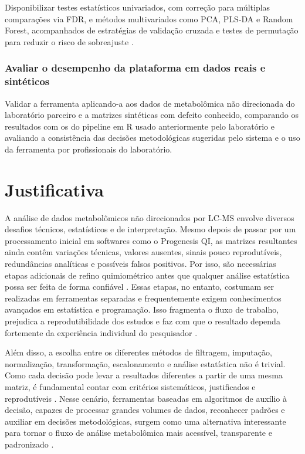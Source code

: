Disponibilizar testes estatísticos univariados, com correção para múltiplas comparações via FDR, e métodos multivariados como PCA, PLS-DA e Random Forest, acompanhados de estratégias de validação cruzada e testes de permutação para reduzir o risco de sobreajuste \cite{worley2013multivariate}.

\subsubsection{Avaliar o desempenho da plataforma em dados reais e sintéticos}
 
Validar a ferramenta aplicando-a aos dados de metabolômica não direcionada do laboratório parceiro e a matrizes sintéticas com defeito conhecido, comparando os resultados com os do pipeline em R usado anteriormente pelo laboratório e avaliando a consistência das decisões metodológicas sugeridas pelo sistema e o uso da ferramenta por profissionais do laboratório.

\section{Justificativa}
 
A análise de dados metabolômicos não direcionados por LC-MS envolve diversos desafios técnicos, estatísticos e de interpretação. Mesmo depois de passar por um processamento inicial em softwares como o Progenesis QI, as matrizes resultantes ainda contêm variações técnicas, valores ausentes, sinais pouco reprodutíveis, redundâncias analíticas e possíveis falsos positivos. Por isso, são necessárias etapas adicionais de refino quimiométrico antes que qualquer análise estatística possa ser feita de forma confiável \cite{mahieu2017systems}. Essas etapas, no entanto, costumam ser realizadas em ferramentas separadas e frequentemente exigem conhecimentos avançados em estatística e programação. Isso fragmenta o fluxo de trabalho, prejudica a reprodutibilidade dos estudos e faz com que o resultado dependa fortemente da experiência individual do pesquisador \cite{weber2017computational}.
 
Além disso, a escolha entre os diferentes métodos de filtragem, imputação, normalização, transformação, escalonamento e análise estatística não é trivial. Como cada decisão pode levar a resultados diferentes a partir de uma mesma matriz, é fundamental contar com critérios sistemáticos, justificados e reprodutíveis \cite{diguida2016non}. Nesse cenário, ferramentas baseadas em algoritmos de auxílio à decisão, capazes de processar grandes volumes de dados, reconhecer padrões e auxiliar em decisões metodológicas, surgem como uma alternativa interessante para tornar o fluxo de análise metabolômica mais acessível, transparente e padronizado \cite{sen2021deep}.
 
